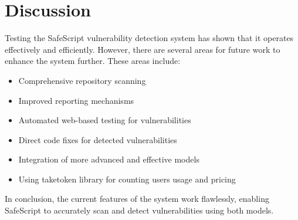 \chapter{Discussion}\label{chap:discussion}

Testing the SafeScript vulnerability detection system has shown that it operates effectively and efficiently. However, there are several areas for 
future work to enhance the system further. These areas include:

\begin{itemize}
\item Comprehensive repository scanning
\item Improved reporting mechanisms
\item Automated web-based testing for vulnerabilities
\item Direct code fixes for detected vulnerabilities
\item Integration of more advanced and effective models
\item Using taketoken library for counting users usage and pricing
\end{itemize}

In conclusion, the current features of the system work flawlessly, enabling SafeScript to accurately scan and detect vulnerabilities using both models.
